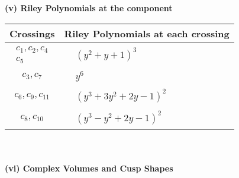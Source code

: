 \documentclass[1p]{elsarticle_modified}
\theoremstyle{definition}
\begin{document}
\newpage\renewcommand{\arraystretch}{1}
\flushleft \textbf{(v) Riley Polynomials at the component}\newline \\
\begin{tabular}{m{50pt}|m{274pt}}
Crossings & \hspace{64pt}Riley Polynomials at each crossing \\
\hline $$\begin{aligned}c_{1},c_{2},c_{4}\\c_{5}\end{aligned}$$&$\begin{aligned}
&(y^2+y+1)^3
\end{aligned}$\\
\hline $$\begin{aligned}c_{3},c_{7}\end{aligned}$$&$\begin{aligned}
&y^6
\end{aligned}$\\
\hline $$\begin{aligned}c_{6},c_{9},c_{11}\end{aligned}$$&$\begin{aligned}
&(y^3+3 y^2+2 y-1)^2
\end{aligned}$\\
\hline $$\begin{aligned}c_{8},c_{10}\end{aligned}$$&$\begin{aligned}
&(y^3- y^2+2 y-1)^2
\end{aligned}$\\
\hline
\end{tabular}\\~\\
\newpage\flushleft \textbf{(vi) Complex Volumes and Cusp Shapes}
\end{document}
